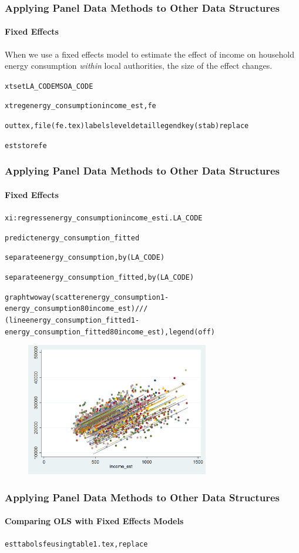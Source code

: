 \documentclass{beamer}
\begin{document}
  \begin{frame}
    \frametitle{Applying Panel Data Methods to Other Data Structures}
    \framesubtitle{Fixed Effects}
    When we use a fixed effects model to estimate the effect of income on household energy consumption \textit{within} local authorities, the size of the effect changes.
    \tiny
    \begin{alltt}
    xtset LA\_CODE MSOA\_CODE
    
    xtreg energy\_consumption income\_est, fe
    
    outtex, file(fe.tex) labels level detail legend key(stab) replace
    
    est store fe
    \end{alltt}
    
    
    
  \end{frame}
  
  \begin{frame}
    \frametitle{Applying Panel Data Methods to Other Data Structures}
    \framesubtitle{Fixed Effects}
    \tiny
    \begin{alltt}
xi: regress energy\_consumption income\_est i.LA\_CODE

predict energy\_consumption\_fitted

separate energy\_consumption, by(LA\_CODE)

separate energy\_consumption\_fitted, by(LA\_CODE)

graph twoway (scatter energy\_consumption1-energy\_consumption80 income\_est) ///
	(line energy\_consumption\_fitted1-energy\_consumption\_fitted80 income\_est), legend(off) 
    \end{alltt}
    
    \begin{figure}
    \includegraphics[width=8cm]{../stata_code/fe.png}
    \centering
    \end{figure}
  \end{frame}
  
  \begin{frame}
    \frametitle{Applying Panel Data Methods to Other Data Structures}
    \framesubtitle{Comparing OLS with Fixed Effects Models}
    \tiny
    \begin{alltt}
      esttab ols fe using table1.tex, replace
    \end{alltt}
    \small
    
    
  \end{frame}
\end{document}
